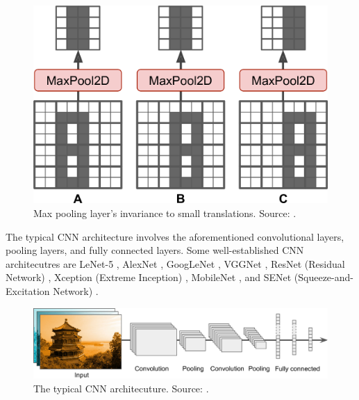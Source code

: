 \documentclass[a4paper,11pt,oneside]{article}
\begin{document}
  \begin{figure}[ht]
    \begin{center}
      \includegraphics[width=.8\textwidth]{max_pooling_invariance.png}
    \end{center}
    \caption{Max pooling layer's invariance to small translations. Source: \cite{geron2019hands}.}
  \end{figure}

  The typical CNN architecture involves the aforementioned convolutional layers, pooling layers, and fully connected layers.
  Some well-established CNN architecutres are LeNet-5 \cite{lecun1998gradient}, AlexNet \cite{krizhevsky2012imagenet},
  GoogLeNet \cite{szegedy2015going}, VGGNet \cite{simonyan2014very}, ResNet (Residual Network) \cite{he2016deep}, Xception
  (Extreme Inception) \cite{chollet2017xception}, MobileNet \cite{howard2017mobilenets, sandler2018mobilenetv2},
  and SENet (Squeeze-and-Excitation Network) \cite{hu2018squeeze}.

  \begin{figure}[ht]
    \begin{center}
      \includegraphics[width=.8\textwidth]{typical_cnn.png}
    \end{center}
    \caption{The typical CNN architecuture. Source: \cite{geron2019hands}.}
  \end{figure}
\end{document}
